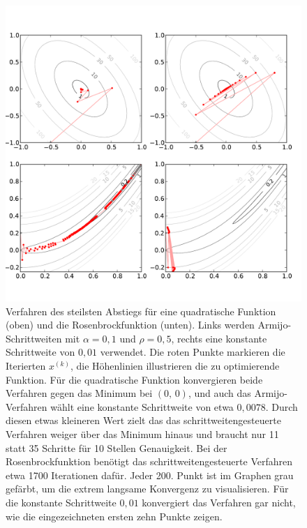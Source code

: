 \begin{figure}
  \centering
  \includegraphics[width=\textwidth]{plots/steepestdescent}
  \caption{Verfahren des steilsten Abstiegs für eine quadratische
    Funktion (oben) und die Rosenbrockfunktion (unten). Links werden
    Armijo-Schrittweiten mit $\alpha=0,1$ und $\rho=0,5$, rechts eine
    konstante Schrittweite von $0,01$ verwendet. Die roten Punkte
    markieren die Iterierten $x^{(k)}$, die Höhenlinien illustrieren
    die zu optimierende Funktion. Für die quadratische Funktion
    konvergieren beide Verfahren gegen das Minimum bei $(0,\,0)$, und
    auch das Armijo-Verfahren wählt eine konstante Schrittweite von
    etwa $0,0078$. Durch diesen etwas kleineren Wert zielt das das
    schrittweitengesteuerte Verfahren weiger über das Minimum hinaus
    und braucht nur 11 statt 35 Schritte für 10 Stellen
    Genauigkeit. Bei der Rosenbrockfunktion benötigt das
    schrittweitengesteuerte Verfahren etwa 1700 Iterationen dafür.
    Jeder 200. Punkt ist im Graphen grau gefärbt, um die extrem
    langsame Konvergenz zu visualisieren. Für die konstante
    Schrittweite $0,01$ konvergiert das Verfahren gar nicht, wie die
    eingezeichneten ersten zehn Punkte zeigen.} \label{fig:armijo}
\end{figure}


